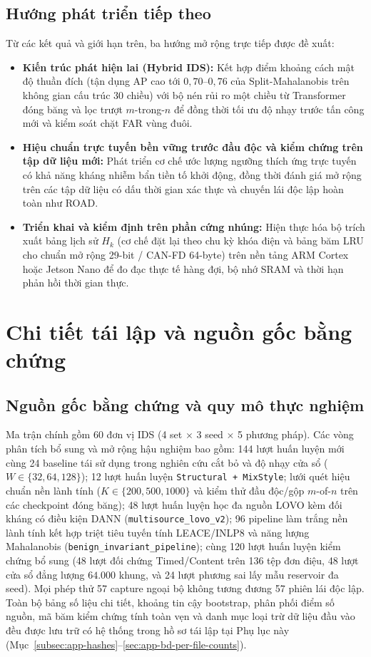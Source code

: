 \documentclass[12pt, a4paper, reqno, oneside]{book}
\newcommand\sect[1]{%
  \Needspace{5\baselineskip}%
  \phantomsection%
  \addcontentsline{toc}{section}{#1}%
  \section*{#1}%
}
\DeclareRobustCommand{\code}[1]{\nolinkurl{#1}}
\begin{document}
\sect{Hướng phát triển tiếp theo}
Từ các kết quả và giới hạn trên, ba hướng mở rộng trực tiếp được đề xuất:
\begin{itemize}
    \item \textbf{Kiến trúc phát hiện lai (Hybrid IDS):} Kết hợp điểm khoảng cách mật độ thuần đích (tận dụng AP cao tới $0{,}70\text{--}0{,}76$ của Split-Mahalanobis trên không gian cấu trúc 30 chiều) với bộ nén rủi ro một chiều từ Transformer đóng băng và lọc trượt $m$-trong-$n$ để đồng thời tối ưu độ nhạy trước tấn công mới và kiểm soát chặt FAR vùng đuôi.
    \item \textbf{Hiệu chuẩn trực tuyến bền vững trước đầu độc và kiểm chứng trên tập dữ liệu mới:} Phát triển cơ chế ước lượng ngưỡng thích ứng trực tuyến có khả năng kháng nhiễm bẩn tiền tố khởi động, đồng thời đánh giá mở rộng trên các tập dữ liệu có dấu thời gian xác thực và chuyến lái độc lập hoàn toàn như ROAD.
    \item \textbf{Triển khai và kiểm định trên phần cứng nhúng:} Hiện thực hóa bộ trích xuất bảng lịch sử $H_k$ (cơ chế đặt lại theo chu kỳ khóa điện và bảng băm LRU cho chuẩn mở rộng 29-bit / CAN-FD 64-byte) trên nền tảng ARM Cortex hoặc Jetson Nano để đo đạc thực tế hàng đợi, bộ nhớ SRAM và thời hạn phản hồi thời gian thực.
\end{itemize}

\appendix
\chapter{Chi tiết tái lập và nguồn gốc bằng chứng}\label{app:reproducibility}
\section{Nguồn gốc bằng chứng và quy mô thực nghiệm}\label{sec:app-provenance}
Ma trận chính gồm 60 đơn vị IDS (4 set $\times$ 3 seed $\times$ 5 phương pháp). Các vòng phân tích bổ sung và mở rộng hậu nghiệm bao gồm: 144 lượt huấn luyện mới cùng 24 baseline tái sử dụng trong nghiên cứu cắt bỏ và độ nhạy cửa sổ ($W \in \{32, 64, 128\}$); 12 lượt huấn luyện \code{Structural + MixStyle}; lưới quét hiệu chuẩn nền lành tính ($K \in \{200, 500, 1000\}$ và kiểm thử đầu độc/gộp $m$-of-$n$ trên các checkpoint đóng băng); 48 lượt huấn luyện học đa nguồn LOVO kèm đối kháng có điều kiện DANN (\code{multisource\_lovo\_v2}); 96 pipeline làm trắng nền lành tính kết hợp triệt tiêu tuyến tính LEACE/INLP8 và năng lượng Mahalanobis (\code{benign\_invariant\_pipeline}); cùng 120 lượt huấn luyện kiểm chứng bổ sung (48 lượt đối chứng Timed/Content trên 136 tệp đơn điệu, 48 lượt cửa sổ đẳng lượng $64.000$ khung, và 24 lượt phương sai lấy mẫu reservoir đa seed). Mọi phép thử 57 capture ngoại bộ không tương đương 57 phiên lái độc lập. Toàn bộ bảng số liệu chi tiết, khoảng tin cậy bootstrap, phân phối điểm số nguồn, mã băm kiểm chứng tính toàn vẹn và danh mục loại trừ dữ liệu đầu vào đều được lưu trữ có hệ thống trong hồ sơ tái lập tại Phụ lục này (Mục~\ref{subsec:app-hashes}--\ref{sec:app-bd-per-file-counts}).
\end{document}
